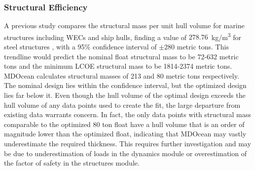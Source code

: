 \subsubsection{Structural Efficiency}
A previous study compares the structural mass per unit hull volume for marine structures including WECs and ship hulls, finding a value of $278.76 $~kg/m\textsuperscript{3} for steel structures \cite{roberts_bringing_2021}, with a 95\% confidence interval of $\pm280$ metric tons.
This trendline would predict the nominal float structural mass to be 72-632 metric tons and the minimum LCOE structural mass to be 1814-2374 metric tons.
MDOcean calculates structural masses of 213 and 80 metric tons respectively.
The nominal design lies within the confidence interval, but the optimized design lies far below it.
Even though the hull volume of the optimal design exceeds the hull volume of any data points used to create the fit, the large departure from existing data warrants concern.
In fact, the only data points with structural mass comparable to the optimized 80 ton float have a hull volume that is an order of magnitude lower than the optimized float, indicating that MDOcean may vastly underestimate the required thickness.
This requires further investigation and may be due to underestimation of loads in the dynamics module or overestimation of the factor of safety in the structures module.


